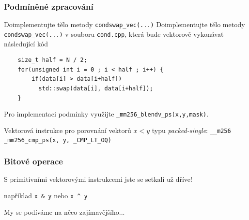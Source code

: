 \documentclass[usenames,dvipsnames,9pt]{beamer}
\begin{document}
{
\begin{frame}[fragile]
  \frametitle{Podmíněné zpracování}

  \begin{block}{Doimplementujte tělo metody \texttt{condswap\_vec(...)}}
    Doimplementujte tělo metody \texttt{condswap\_vec(...)} v souboru \texttt{cond.cpp}, která bude vektorově vykonávat následující kód
    \begin{verbatim}
    size_t half = N / 2;
    for(unsigned int i = 0 ; i < half ; i++) {
        if(data[i] > data[i+half])
          std::swap(data[i], data[i+half]);
    }
    \end{verbatim}
    Pro implementaci podmínky využijte \texttt{_mm256_blendv_ps(x,y,mask)}.
  \end{block}

  \vspace{1.5em}

  Vektorová instrukce pro porovnání vektorů $x < y$ typu \emph{packed-single}:
  \texttt{__m256 _mm256_cmp_ps(x, y, _CMP_LT_OQ)}
\end{frame}
}


\begin{frame}
  \frametitle{Bitové operace}

  \begin{center}
    \Large S primitivními vektorovými instrukcemi jste se setkali už dříve!

    \normalsize například \texttt{x & y} nebo \texttt{x ^ y}
  \end{center}

  \vspace{3em}

  \pause
  \hfill My se podíváme na něco zajímavějšího...
\end{frame}
\end{document}
